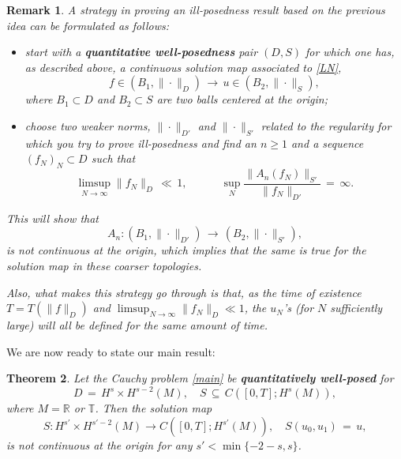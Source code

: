 \documentclass{amsart}
\newtheorem{theorem}{Theorem}[section]
\newtheorem{remark}[theorem]{Remark}
\begin{document}
\begin{remark}
A strategy in proving an ill-posedness result based on the previous idea can be formulated as follows:
\begin{itemize}
\item start with a \textbf{quantitative well-posedness} pair $(D,S)$ for which one has, as described above, a continuous solution map associated to \eqref{LN},
\begin{equation}
f\in (B_1,\|\cdot \|_D)\,\longrightarrow\,u\in (B_2,\|\cdot \|_S),
\end{equation} 
where $B_1\subset D$ and $B_2 \subset S$ are two balls centered at the origin;

\item choose two weaker norms, $\| \cdot\|_{D'}$ and $\| \cdot\|_{S'}$ related to the regularity for which you try to prove ill-posedness and find an $n\geq 1$ and a sequence $(f_N)_N\subset D$ such that
\begin{equation}
\limsup_{N\to \infty} \|f_N\|_D\,\ll\,1, \qquad \quad \sup_N \frac{\|A_n(f_N)\|_{S'}}{\|f_N\|_{D'}}\,=\,\infty.
\label{ip}
\end{equation}
\end{itemize}  
This will show that 
\begin{equation}
A_n: (B_1,\|\cdot \|_{D'})\,\longrightarrow\,(B_2,\| \cdot\|_{S'}),
\end{equation} 
is not continuous at the origin, which implies that the same is true for the solution map in these coarser  topologies.

Also, what makes this strategy go through is that, as the time of existence $T=T(\|f\|_D)$ and $\limsup_{N\to \infty} \|f_N\|_D \ll 1$, the $u_N$'s (for $N$ sufficiently large) will all be defined for the same amount of time.
\label{ipr}
\end{remark}

We are now ready to state our main result:

\begin{theorem}
Let the Cauchy problem \eqref{main} be \textbf{quantitatively well-posed} for
\[
D\,=\,H^s \times H^{s-2}(M), \quad S\,\subseteq \,C([0,T]; H^s(M)), \]
where  $M=\mathbb{R}$ or $\mathbb{T}$. Then the solution map
\begin{equation}
S: H^{s'} \times H^{s'-2}(M) \to C([0,T]; H^{s'}(M)), \quad
S(u_0,u_1)\,=\,u,
\label{solmap}
\end{equation}
is not continuous at the origin for any $s'< \min\{-2-s, s\}$.
\label{mainth}
\end{theorem}
\end{document}
